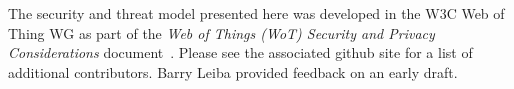 The security and threat model presented here was developed 
in the W3C Web of Thing WG as part of the 
\textit{Web of Things (WoT) Security and Privacy Considerations} 
document~\cite{Wot2017sec}. Please see the associated github site
for a list of additional contributors.
Barry Leiba provided feedback on an early draft.
